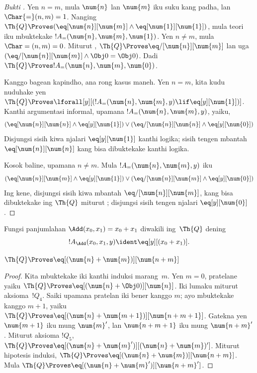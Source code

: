 \documentclass[../../../include/open-logic-section]{subfiles}
\begin{document}
\begin{proof}[Bukti ]
Yen $n = m$, mula $\num{n}$ lan $\num{m}$ iku suku kang padha, lan
$\Char{=}(n, m) = 1$. Nanging $\Th{Q} \Proves (\eq[\num{n}][\num{m}] \land
\eq[\num{1}][\num{1}])$, mula teori iku mbuktekake $!A_=(\num{n}, \num{m},
\num{1})$. Yen $n \neq m$, mula $\Char=(n, m) = 0$. Miturut
, $\Th{Q} \Proves \eq/[\num{n}][\num{m}]$ lan
uga $(\eq/[\num{n}][\num{m}] \land \Obj 0 = \Obj 0)$. Dadi $\Th{Q}
\Proves !A_=(\num{n}, \num{m}, \num{0})$.

Kanggo bagean kapindho, ana rong kasus maneh. Yen $n = m$, kita kudu
nuduhake yen $\Th{Q} \Proves \lforall[y][(!A_=(\num{n}, \num{m}, y)
  \lif \eq[y][\num{1}])]$. Kanthi argumentasi informal, upamana $!A_=(\num{n},
\num{m}, y)$, yaiku,
\[
(\eq[\num{n}][\num{n}] \land \eq[y][\num{1}]) \lor
(\eq/[\num{n}][\num{n}] \land \eq[y][\num{0}])
\]
Disjungsi sisih kiwa njalari $\eq[y][\num{1}]$ kanthi logika; sisih
tengen mbantah $\eq[\num{n}][\num{n}]$ kang bisa dibuktekake kanthi
logika.

Kosok baline, upamana $n \neq m$. Mula $!A_=(\num{n},
\num{m}, y)$ iku
\[
(\eq[\num{n}][\num{m}] \land \eq[y][\num{1}]) \lor
(\eq/[\num{n}][\num{m}] \land \eq[y][\num{0}])
\]
Ing kene, disjungsi sisih kiwa mbantah $\eq/[\num{n}][\num{m}]$, kang
bisa dibuktekake ing $\Th{Q}$ miturut ;
disjungsi sisih tengen njalari $\eq[y][\num{0}]$.
\end{proof}

\begin{prop}
Fungsi panjumlahan $\Add(x_0, x_1) = x_0+x_1$ diwakili
ing~$\Th{Q}$ dening
\[
  !A_{\Add}(x_0, x_1, y) \ident \eq[y][(x_0 + x_1)].
\]
\end{prop}

\begin{lem}
$\Th{Q} \Proves \eq[(\num{n} + \num{m})][\num{n+m}]$
\end{lem}

\begin{proof}
Kita mbuktekake iki kanthi induksi marang~$m$. Yen $m = 0$, pratelane
yaiku $\Th{Q} \Proves \eq[(\num{n} + \Obj 0)][\num{n}]$. Iki lumaku
miturut aksioma~$!Q_4$. Saiki upamana pratelan iki bener kanggo $m$;
ayo mbuktekake kanggo $m+1$, yaiku $\Th{Q} \Proves \eq[(\num{n} +
  \num{m+1})][\num{n+m+1}]$. Gatekna yen $\num{m+1}$ iku mung $\num{m}'$,
lan $\num{n+m+1}$ iku mung $\num{n+m}'$. Miturut aksioma $!Q_5$, $\Th{Q}
\Proves \eq[(\num{n} + \num{m}')][(\num{n}+\num{m})']$. Miturut
hipotesis induksi, $\Th{Q} \Proves \eq[(\num{n} + \num{m})][\num{n+m}]$.
Mula $\Th{Q} \Proves \eq[(\num{n} + \num{m}')][\num{n+m}']$.
\end{proof}
\end{document}
